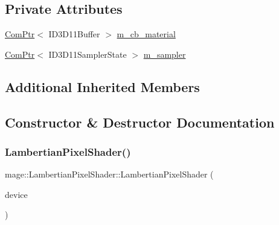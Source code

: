 \subsection*{Private Attributes}
\begin{DoxyCompactItemize}
\item 
\hyperlink{namespacemage_ae74f374780900893caa5555d1031fd79}{Com\+Ptr}$<$ I\+D3\+D11\+Buffer $>$ \hyperlink{classmage_1_1_lambertian_pixel_shader_aff89982b5f85531515ec2316930b2944}{m\+\_\+cb\+\_\+material}
\item 
\hyperlink{namespacemage_ae74f374780900893caa5555d1031fd79}{Com\+Ptr}$<$ I\+D3\+D11\+Sampler\+State $>$ \hyperlink{classmage_1_1_lambertian_pixel_shader_af90588b8ecf4ba9aa796ee3ed74519b5}{m\+\_\+sampler}
\end{DoxyCompactItemize}
\subsection*{Additional Inherited Members}


\subsection{Constructor \& Destructor Documentation}
\hypertarget{classmage_1_1_lambertian_pixel_shader_a311a8f1c511a0066a4fe6d9c29b97d1c}{}\label{classmage_1_1_lambertian_pixel_shader_a311a8f1c511a0066a4fe6d9c29b97d1c} 
\subsubsection{\texorpdfstring{Lambertian\+Pixel\+Shader()}{LambertianPixelShader()}\hspace{0.1cm}{\footnotesize\ttfamily [1/2]}}
{\footnotesize\ttfamily mage\+::\+Lambertian\+Pixel\+Shader\+::\+Lambertian\+Pixel\+Shader (\begin{DoxyParamCaption}\item[{\hyperlink{namespacemage_ae74f374780900893caa5555d1031fd79}{Com\+Ptr}$<$ I\+D3\+D11\+Device2 $>$}]{device }\end{DoxyParamCaption})}

\hypertarget{classmage_1_1_lambertian_pixel_shader_aedea7342ae95c6532a086fb28978b5b0}{}\label{classmage_1_1_lambertian_pixel_shader_aedea7342ae95c6532a086fb28978b5b0} 
